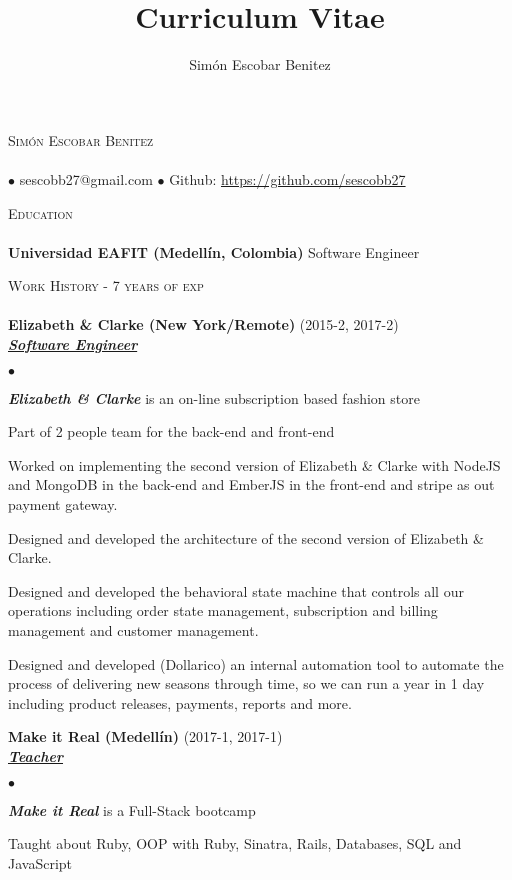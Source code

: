 \documentclass[a4paper]{article}
\title{Curriculum Vitae}
\author{Sim\'on Escobar Benitez}
\newcommand{\lineunder}{\vspace*{-8pt} \\ \hspace*{-18pt} \hrulefill \\}
\newcommand{\header}[1]{{\hspace*{-15pt}\vspace*{6pt}
\textsc{#1}} \vspace*{-6pt} \lineunder}
\newcommand{\employer}[3]{{
\textbf{#1} (#2)\\ \underline{\textbf{\emph{#3}}}\\ }}
\newcommand{\contact}[2]{
\vspace*{-8pt}
\begin{center}
{\LARGE \scshape {#1}} \lineunder #2
\end{center}
\vspace*{-8pt} }
\newenvironment{achievements}{\begin{list}{$\bullet$}{\topsep 0pt \itemsep
-2pt}}{\vspace*{4pt}\end{list}}
\newcommand{\schoolwithcourses}[2]{
\textbf{#1} #2
\vspace*{5pt} }
\newcommand{\emphasys}[1]{\textbf{\emph{#1}}}
\begin{document}
\small
\smallskip
\vspace*{-44pt}
\contact{Sim\'on Escobar Benitez} { $\bullet$ sescobb27@gmail.com $\bullet$ Github: \url{https://github.com/sescobb27} }
\header{Education}
\schoolwithcourses{Universidad EAFIT (Medell\'in, Colombia)}{Software Engineer}

\header{Work History - 7 years of exp}

\employer{ Elizabeth \& Clarke (New York/Remote)}{2015-2, 2017-2}{Software Engineer}
\begin{achievements}
\item \emphasys{Elizabeth \& Clarke} is an on-line subscription based fashion store
\item Part of 2 people team for the back-end and front-end
\item Worked on implementing the second version of Elizabeth \& Clarke with NodeJS and MongoDB in the back-end and EmberJS in the front-end and stripe as out payment gateway.
\item Designed and developed the architecture of the second version of Elizabeth \& Clarke.
\item Designed and developed the behavioral state machine that controls all our operations including order state management, subscription and billing management and customer management.
\item Designed and developed (Dollarico) an internal automation tool to automate the process of delivering new seasons through time, so we can run a year in 1 day including product releases, payments, reports and more.
\end{achievements}

\employer{Make it Real (Medell\'in)}{2017-1, 2017-1}{Teacher}
\begin{achievements}
\item \emphasys{Make it Real} is a Full-Stack bootcamp
\item Taught about Ruby, OOP with Ruby, Sinatra, Rails, Databases, SQL and JavaScript
\end{achievements}
\end{document}
